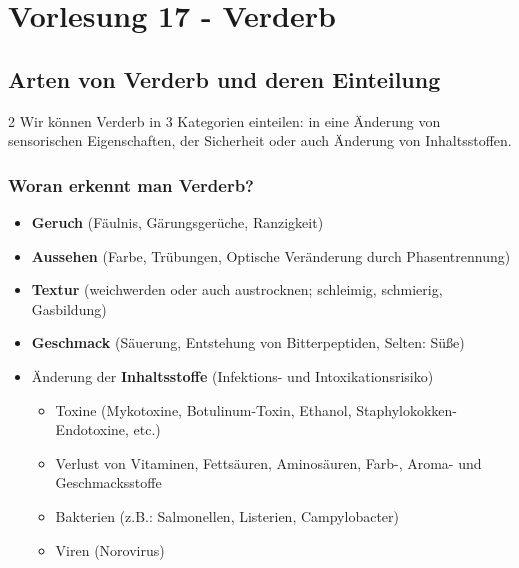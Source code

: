 \documentclass[a4paper,10pt]{article}
\begin{document}
\sidebar
{}
\par \vspace*{5mm}
\section*{Vorlesung 17 - Verderb}
\subsection{Arten von Verderb und deren Einteilung}
\begin{multicols}{2}
Wir können Verderb in 3 Kategorien einteilen: in eine Änderung von sensorischen Eigenschaften, der Sicherheit oder auch Änderung von Inhaltsstoffen.
\pp
\subsubsection{Woran erkennt man Verderb?}
\begin{itemize}
\item \textbf{Geruch} (Fäulnis, Gärungsgerüche, Ranzigkeit)
\item \textbf{Aussehen} (Farbe, Trübungen, Optische Veränderung durch Phasentrennung)
\item \textbf{Textur} (weichwerden oder auch austrocknen; schleimig, schmierig, Gasbildung)
\item \textbf{Geschmack} (Säuerung, Entstehung von Bitterpeptiden, Selten: Süße)
\item Änderung der \textbf{Inhaltsstoffe} (Infektions- und Intoxikationsrisiko)
\begin{itemize}
\item Toxine (Mykotoxine, Botulinum-Toxin, Ethanol, Staphylokokken-Endotoxine, etc.)
\item Verlust von Vitaminen, Fettsäuren, Aminosäuren, Farb-, Aroma- und Geschmacksstoffe
\item Bakterien (z.B.: Salmonellen, Listerien, Campylobacter)
\item Viren (Norovirus)
\end{itemize}
\end{itemize}

\columnbreak

\end{multicols}
\end{document}

